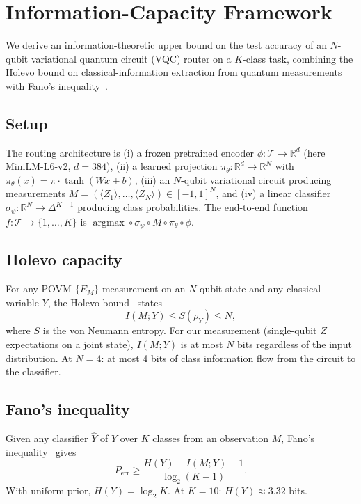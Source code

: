 \section{Information-Capacity Framework}
\label{sec:info-bound}

We derive an information-theoretic upper bound on the test accuracy of an
$N$-qubit variational quantum circuit (VQC) router on a $K$-class task,
combining the Holevo bound on classical-information extraction from quantum
measurements~\cite{holevo1973bounds} with Fano's inequality~\cite{fano1961transmission}.

\subsection{Setup}

The routing architecture is (i) a frozen pretrained encoder $\phi : \mathcal{T} \to \mathbb{R}^{d}$
(here MiniLM-L6-v2, $d=384$), (ii) a learned projection $\pi_\theta : \mathbb{R}^d \to \mathbb{R}^{N}$
with $\pi_\theta(x) = \pi \cdot \tanh(W x + b)$, (iii) an $N$-qubit variational
circuit producing measurements $M = (\langle Z_1 \rangle, \ldots, \langle Z_N \rangle)
\in [-1, 1]^N$, and (iv) a linear classifier $\sigma_\psi : \mathbb{R}^N \to \Delta^{K-1}$
producing class probabilities. The end-to-end function $f : \mathcal{T} \to \{1, \ldots, K\}$
is $\mathop{\arg\max} \circ \sigma_\psi \circ M \circ \pi_\theta \circ \phi$.

\subsection{Holevo capacity}

For any POVM $\{E_M\}$ measurement on an $N$-qubit state and any classical variable
$Y$, the Holevo bound~\cite{holevo1973bounds} states
\begin{equation}
I(M; Y) \leq S(\rho_Y) \leq N,
\label{eq:holevo}
\end{equation}
where $S$ is the von Neumann entropy. For our measurement (single-qubit $Z$
expectations on a joint state), $I(M; Y)$ is at most $N$ bits regardless of
the input distribution. At $N = 4$: at most 4 bits of class information
flow from the circuit to the classifier.

\subsection{Fano's inequality}

Given any classifier $\hat{Y}$ of $Y$ over $K$ classes from an observation
$M$, Fano's inequality~\cite{fano1961transmission} gives
\begin{equation}
P_\mathrm{err} \geq \frac{H(Y) - I(M; Y) - 1}{\log_2(K - 1)}.
\label{eq:fano}
\end{equation}
With uniform prior, $H(Y) = \log_2 K$. At $K = 10$: $H(Y) \approx 3.32$ bits.

